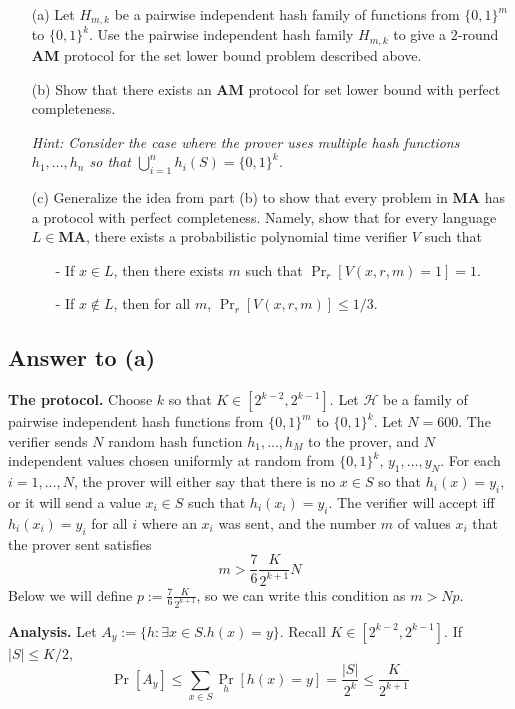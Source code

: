\documentclass{article}
\newcommand{\AM}{\mathbf{AM}}
\newcommand{\MA}{\mathbf{MA}}
\begin{document}
\begin{enumerate}
    \item[(a)] Let $H_{m,k}$ be a pairwise independent hash family of functions from $\{0,1\}^m$ to $\{0,1\}^k$. Use the pairwise independent hash family $H_{m,k}$ to give a $2$-round $\AM$ protocol for the set lower bound problem described above.
    
    \item[(b)] Show that there exists an $\AM$ protocol for set lower bound with perfect completeness.

    \emph{Hint: Consider the case where the prover uses multiple hash functions $h_1,\dots, h_n$ so that $\bigcup_{i = 1}^n h_i(S) = \{0,1\}^k$.}
    
    \item[(c)] Generalize the idea from part (b) to show that every problem in $\MA$ has a protocol with perfect completeness. Namely, show that for every language $L\in \MA$, there exists a probabilistic polynomial time verifier $V$ such that 
    \begin{enumerate}
        \item[-] If $x\in L$, then there exists $m$ such that $\Pr_r[V(x,r,m) = 1] = 1$.
        \item[-] If $x\not\in L$, then for all $m$, $\Pr_r[V(x,r,m)]\le 1/3$.
    \end{enumerate}
\end{enumerate}

\newpage
\subsection*{Answer to (a)}
\textbf{The protocol.}
Choose $k$ so that $K \in [2^{k-2}, 2^{k-1}]$.
Let $\mathcal{H}$ be a family of pairwise independent hash functions from $\{0, 1\}^m$ to $\{0, 1\}^k$.
Let $N = 600$.
The verifier sends $N$ random hash function $h_1, \dots, h_M$ to the prover,
and $N$ independent values chosen uniformly at random from $\{0, 1\}^k$, $y_1, \dots, y_N$.
For each $i = 1, \dots, N$, the prover will either say that there is no $x \in S$ so that $h_i(x) = y_i$, or it will send a value $x_i \in S$ such that $h_i(x_i) = y_i$.
The verifier will accept iff $h_i(x_i) = y_i$ for all $i$ where an $x_i$ was sent,
and the number $m$ of values $x_i$ that the prover sent satisfies
$$
m > \frac{7}{6} \frac{K}{2^{k+1}} N
$$
Below we will define $p := \frac{7}{6} \frac{K}{2^{k+1}}$, so we can write this condition as $m > Np$.

\medskip
\noindent
\textbf{Analysis.}
Let $A_y := \{h : \exists x \in S . h(x) = y\}$.
Recall $K \in [2^{k-2}, 2^{k-1}]$.
If $|S| \leq K/2$,
$$
\Pr[A_y] \leq \sum_{x \in S}\Pr_h[h(x) = y] = \frac{|S|}{2^k} \leq \frac{K}{2^{k+1}}
$$
\end{document}
